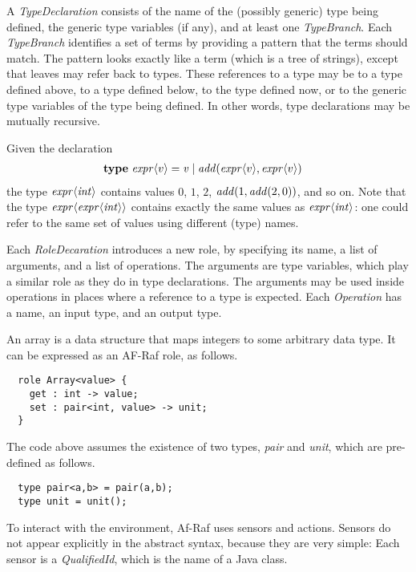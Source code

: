 \documentclass[a4paper,12pt,oneside,fleqn]{book} %
\begin{document}
A {\it TypeDeclaration\/} consists of the name of the (possibly generic)
type being defined, the generic type variables (if any), and at least one
{\it TypeBranch}. Each {\it TypeBranch\/} identifies a set of terms by
providing a pattern that the terms should match. The pattern looks exactly
like a term (which is a tree of strings), except that leaves may refer back
to types. These references to a type may be to a type defined above, to a
type defined below, to the type defined now, or to the generic type
variables of the type being defined. In other words, type declarations may
be mutually recursive.

\begin{example}
Given the declaration
\begin{align}
&{\bf type}\ {\it expr}\langle v\rangle
  = {\it v}
  \mid {\it add}({\it expr}\langle v\rangle, {\it expr}\langle v\rangle)
\end{align}
the type ${\it expr}\langle{\it int}\rangle$ contains values $0$, $1$, $2$,
${\it add}(1,{\it add}(2,0))$, and so on. Note that the type ${\it
expr}\langle{\it expr}\langle{\it int}\rangle\rangle$ contains exactly the
same values as ${\it expr}\langle{\it int}\rangle$: one could refer to the
same set of values using different (type) names.
\end{example}

Each {\it RoleDecaration\/} introduces a new role, by specifying its name,
a list of arguments, and a list of operations. The arguments are type
variables, which play a similar role as they do in type declarations. The
arguments may be used inside operations in places where a reference to a
type is expected. Each {\it Operation\/} has a name, an input type, and an
output type.

\begin{example}
An array is a data structure that maps integers to some arbitrary data
type. It can be expressed as an AF-Raf role, as follows.
\begin{verbatim}
  role Array<value> {
    get : int -> value;
    set : pair<int, value> -> unit;
  }
\end{verbatim}
The code above assumes the existence of two types, {\it pair\/} and {\it
unit}, which are pre-defined as follows.
\begin{verbatim}
  type pair<a,b> = pair(a,b);
  type unit = unit();
\end{verbatim}
\end{example}

To interact with the environment, Af-Raf uses sensors and actions.
Sensors do not appear explicitly in the abstract syntax, because they
are very simple: Each sensor is a {\it QualifiedId}, which is the name of a
Java class.
\end{document}
